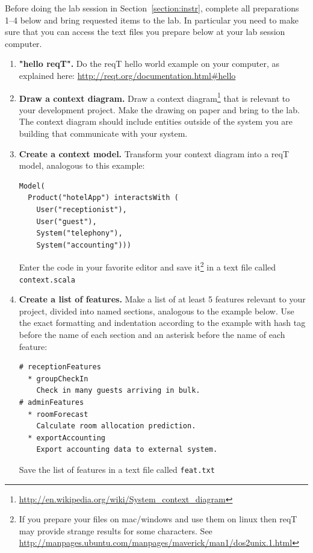 \documentclass[11pt]{article}
\begin{document}
\begin{framed} \noindent Before doing the lab session in Section~\ref{section:instr}, complete all preparations 1--4 below and bring requested items to the lab. In particular you need to make sure that you can access the text files you prepare below at your lab session computer.
\end{framed}

\begin{enumerate}
\item {\bf "hello reqT".} Do the reqT hello world example on your computer, as explained here:  \url{http://reqt.org/documentation.html\#hello}
\item {\bf Draw a context diagram.} Draw a context diagram\footnote{\url{http://en.wikipedia.org/wiki/System_context_diagram}} that  is relevant to your development project. Make the drawing on paper and bring to the lab. The context diagram should include entities outside of the system you are building that communicate with your system. 
\item {\bf Create a context model.} Transform your context diagram into a reqT model, analogous to this  example: 
{\footnotesize\begin{verbatim}
Model(
  Product("hotelApp") interactsWith (
    User("receptionist"), 
    User("guest"), 
    System("telephony"), 
    System("accounting")))
\end{verbatim}}
Enter the code in your favorite editor and save it\footnote{If you prepare your files on mac/windows and use them on linux then reqT may provide strange results for some characters. See \url{http://manpages.ubuntu.com/manpages/maverick/man1/dos2unix.1.html}} in a text file called \verb+context.scala+
\item {\bf Create a list of features.} Make a list of at least 5 features relevant to your project, divided into named sections, analogous to the example below. Use the exact formatting and indentation according to the example with hash tag before the name of each section and an asterisk before the name of each feature: 
{\scriptsize\begin{verbatim}
# receptionFeatures
  * groupCheckIn
    Check in many guests arriving in bulk.
# adminFeatures
  * roomForecast
    Calculate room allocation prediction.
  * exportAccounting
    Export accounting data to external system.
\end{verbatim}}
Save the list of features in a text file called \verb+feat.txt+  
\end{enumerate}
\clearpage\newpage
\end{document}
